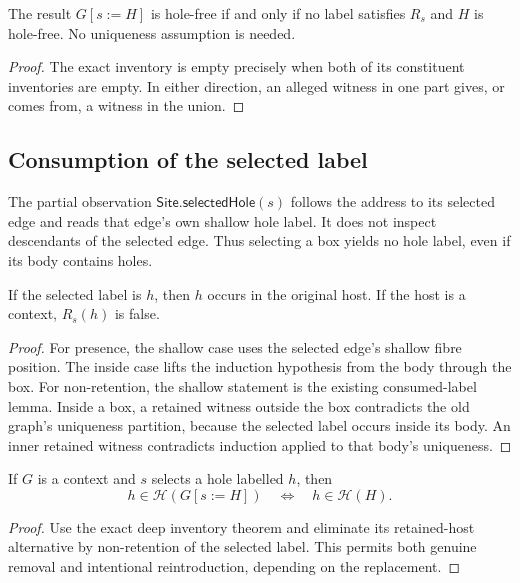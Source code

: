 \begin{theorem}
The result $G[s:=H]$ is hole-free if and only if no label satisfies $R_s$ and $H$
is hole-free. No uniqueness assumption is needed.
\end{theorem}
\begin{proof}
The exact inventory is empty precisely when both of its constituent inventories
are empty. In either direction, an alleged witness in one part gives, or comes
from, a witness in the union.
\end{proof}

\subsection{Consumption of the selected label}

\begin{definition}\label{term:selected-hole}
The partial observation $\mathsf{Site.selectedHole}(s)$ follows the address to
its selected edge and reads that edge's own shallow hole label. It does not
inspect descendants of the selected edge. Thus selecting a box yields no hole
label, even if its body contains holes.
\end{definition}

\begin{lemma}
If the selected label is $h$, then $h$ occurs in the original host. If the host
is a context, $R_s(h)$ is false.
\end{lemma}
\begin{proof}
For presence, the shallow case uses the selected edge's shallow fibre position.
The inside case lifts the induction hypothesis from the body through the box.
For non-retention, the shallow statement is the existing consumed-label lemma.
Inside a box, a retained witness outside the box contradicts the old graph's
uniqueness partition, because the selected label occurs inside its body. An
inner retained witness contradicts induction applied to that body's uniqueness.
\end{proof}

\begin{theorem}
If $G$ is a context and $s$ selects a hole labelled $h$, then
\[
 h\in\mathcal H(G[s:=H])\quad\Longleftrightarrow\quad h\in\mathcal H(H).
\]
\end{theorem}
\begin{proof}
Use the exact deep inventory theorem and eliminate its retained-host alternative
by non-retention of the selected label. This permits both genuine removal and
intentional reintroduction, depending on the replacement.
\end{proof}

